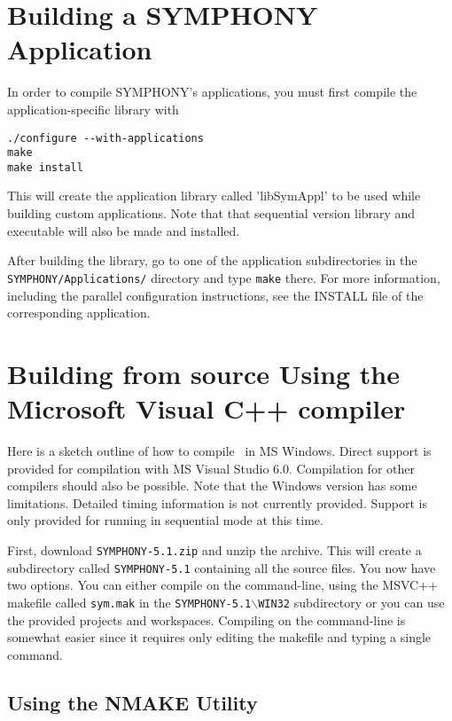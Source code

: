 \section{Building a SYMPHONY Application}

In order to compile SYMPHONY's applications, you must first compile the 
application-specific library with
\begin{verbatim}
./configure --with-applications
make 
make install
\end{verbatim}
This will create the application library called 'libSymAppl' to be used while
building custom applications. Note that that sequential version library and
executable will also be made and installed.

After building the library, go to one of the application subdirectories in the
\texttt{SYMPHONY/Applications/} directory and type \texttt{make} there. For
more information, including the parallel configuration instructions, see the
INSTALL file of the corresponding application.

\section{Building from source Using the Microsoft Visual C++ compiler}
\label{getting_started_windows}

Here is a sketch outline of how to compile \BB\ in MS Windows. Direct support
is provided for compilation with MS Visual Studio 6.0. Compilation for other
compilers should also be possible. Note that the Windows version has some
limitations. Detailed timing information is not currently provided. Support is
only provided for running in sequential mode at this time.

First, download \texttt{SYMPHONY-5.1.zip} and unzip the archive. This will
create a subdirectory called \texttt{SYMPHONY-5.1} containing all the source
files. You now have two options. You can either compile on the command-line,
using the MSVC++ makefile called
\texttt{sym.mak} in the \texttt{SYMPHONY-5.1$\backslash$WIN32} subdirectory or 
you can use the provided projects and workspaces. Compiling on the command-line 
is somewhat easier since it requires only editing the makefile and typing a
single command.

\subsection{Using the NMAKE Utility}
\label{using_nmake}


